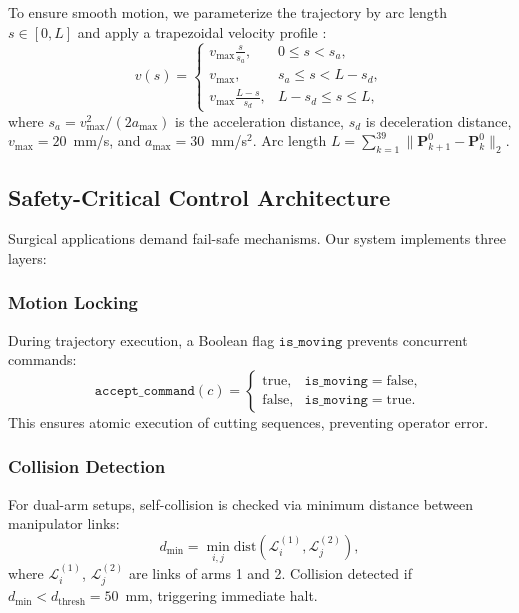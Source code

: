 \documentclass[journal]{IEEEtran}
\begin{document}
To ensure smooth motion, we parameterize the trajectory by arc length $s \in [0, L]$ and apply a trapezoidal velocity profile \cite{biagiotti2008trajectory}:
\begin{equation}
v(s) = 
\begin{cases}
v_{\max} \frac{s}{s_a}, & 0 \leq s < s_a, \\
v_{\max}, & s_a \leq s < L - s_d, \\
v_{\max} \frac{L - s}{s_d}, & L - s_d \leq s \leq L,
\end{cases}
\label{eq:velocity_profile}
\end{equation}
where $s_a = v_{\max}^2 / (2 a_{\max})$ is the acceleration distance, $s_d$ is deceleration distance, $v_{\max} = 20$~mm/s, and $a_{\max} = 30$~mm/s$^2$. Arc length $L = \sum_{k=1}^{39} \|\boldsymbol{P}_{k+1}^{0} - \boldsymbol{P}_{k}^{0}\|_2$.

\subsection{Safety-Critical Control Architecture}

Surgical applications demand fail-safe mechanisms. Our system implements three layers:

\subsubsection{Motion Locking}

During trajectory execution, a Boolean flag $\texttt{is\_moving}$ prevents concurrent commands:
\begin{equation}
\texttt{accept\_command}(c) = 
\begin{cases}
\text{true}, & \texttt{is\_moving} = \text{false}, \\
\text{false}, & \texttt{is\_moving} = \text{true}.
\end{cases}
\label{eq:motion_lock}
\end{equation}
This ensures atomic execution of cutting sequences, preventing operator error.

\subsubsection{Collision Detection}

For dual-arm setups, self-collision is checked via minimum distance between manipulator links:
\begin{equation}
d_{\min} = \min_{i,j} \text{dist}(\mathcal{L}_i^{(1)}, \mathcal{L}_j^{(2)}),
\label{eq:min_distance}
\end{equation}
where $\mathcal{L}_i^{(1)}$, $\mathcal{L}_j^{(2)}$ are links of arms 1 and 2. Collision detected if $d_{\min} < d_{\text{thresh}} = 50$~mm, triggering immediate halt.
\end{document}
